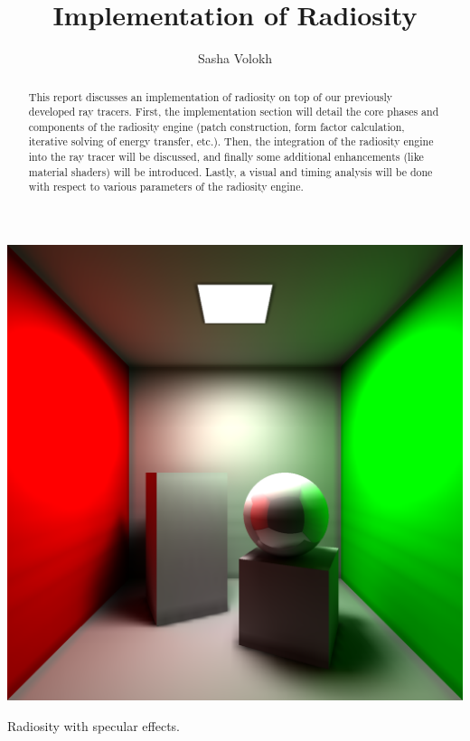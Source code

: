 \documentclass[sigconf]{acmart}
\begin{document}
\title{Implementation of Radiosity}

\author{Sasha Volokh}

\begin{abstract}

This report discusses an implementation of radiosity on top of our previously developed ray tracers. First, the implementation section will detail the core phases and components of the radiosity engine (patch construction, form factor calculation, iterative solving of energy transfer, etc.). Then, the integration of the radiosity engine into the ray tracer will be discussed, and finally some additional enhancements (like material shaders) will be introduced. Lastly, a visual and timing analysis will be done with respect to various parameters of the radiosity engine.

\end{abstract}

\begin{teaserfigure}
  \centering
  \includegraphics[width=6.0in]{reportfiles/teaser}
  \caption{Radiosity with specular effects.}
\end{teaserfigure}

\maketitle
\end{document}
